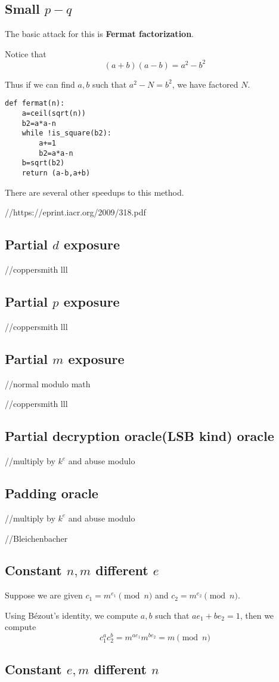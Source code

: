 \documentclass{report}
\begin{document}
\subsection{Small $p-q$}
The basic attack for this is \textbf{Fermat factorization}.

Notice that $$(a+b)(a-b)=a^2-b^2$$

Thus if we can find $a,b$ such that $a^2-N=b^2$, we have factored $N$. 

\begin{lstlisting}
def fermat(n):
	a=ceil(sqrt(n))
	b2=a*a-n
	while !is_square(b2):
		a+=1
		b2=a*a-n
	b=sqrt(b2)
	return (a-b,a+b)
\end{lstlisting}

There are several other speedups to this method.

//https://eprint.iacr.org/2009/318.pdf
\subsection{Partial $d$ exposure}
//coppersmith lll
\subsection{Partial $p$ exposure}
//coppersmith lll
\subsection{Partial $m$ exposure}
//normal modulo math

//coppersmith lll
\subsection{Partial decryption oracle(LSB kind) oracle}
//multiply by $k^e$ and abuse modulo
\subsection{Padding oracle}
//multiply by $k^e$ and abuse modulo

//Bleichenbacher
\subsection{Constant $n,m$ different $e$}
Suppose we are given $c_1=m^{e_1}\pmod n$ and $c_2=m^{e_2}\pmod n$. 

Using B\'ezout's identity, we compute $a,b$ such that $ae_1+be_2=1$, then we compute $$c_1^ac_2^b=m^{ae_1}m^{be_2}=m\pmod n$$

\subsection{Constant $e,m$ different $n$}
\end{document}
